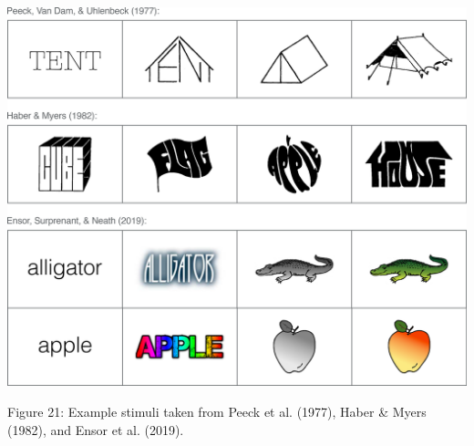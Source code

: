 \documentclass[
  11pt,
]{article}
\begin{document}
\begin{center}\includegraphics[width=1\linewidth]{./resources/images/exp5__background_stim_examples} \end{center}

Figure 21: Example stimuli taken from Peeck et al. (1977), Haber \&
Myers (1982), and Ensor et al. (2019).
\end{document}
